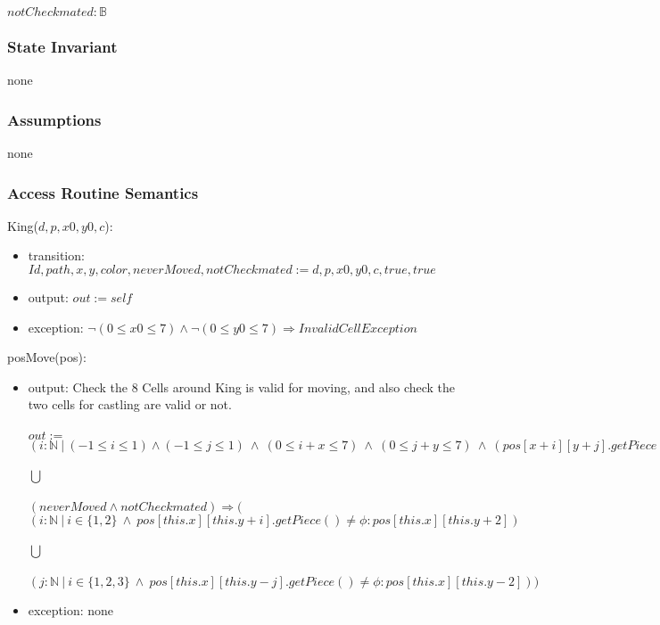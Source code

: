 \documentclass[12pt]{article}
\begin{document}
$notCheckmated: \mathbb{B}$

\subsubsection* {State Invariant}

none

\subsubsection* {Assumptions}

none

\subsubsection* {Access Routine Semantics}

King($d, p, x0, y0, c$):
\begin{itemize}
\item transition: $Id, path, x, y, color, neverMoved, notCheckmated := d, p, x0, y0, c, true, true$
\item output: $out := \mathit{self}$
\item exception: $ \neg (0 \leq x0 \leq 7) \wedge  \neg (0 \leq y0 \leq 7) \Rightarrow InvalidCellException$
\end{itemize}

\noindent posMove(pos):
\begin{itemize}
\item output: Check the 8 Cells around King is valid for moving, and also check the two cells for castling are valid or not.\\
\\
$out :=$\\
$(i : \mathbb{N} \ | \ (-1 \leq i \leq 1) \wedge (-1 \leq j \leq 1)\ \wedge \ (0 \leq i + x \leq 7) \ \wedge \ (0 \leq j+y \leq 7) \ \wedge \ (pos[x+i][y+j].getPiece() = \phi \vee pos[x+i][y+j].getPiece().getColor() \ne this.getColor()) : pos[x+i][y+j]) $ \\
\\
$\bigcup$\\
\\
$(neverMoved \wedge notCheckmated) \Rightarrow ($\\
$(i : \mathbb{N} \ | \ i \in \{1,2\} \  \wedge \ pos[this.x][this.y + i].getPiece() \ne \phi : pos[this.x][this.y + 2])$\\
\\
$\bigcup$\\
\\
$(j : \mathbb{N} \ | \ i \in \{1,2,3\} \  \wedge \ pos[this.x][this.y - j].getPiece() \ne \phi : pos[this.x][this.y - 2]))$\\
\item exception: none
\end{itemize}
\end{document}
